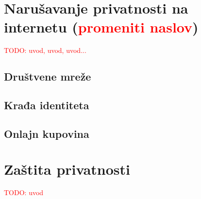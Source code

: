 \documentclass[a4paper]{article}
\newcommand\todos[1]{\textcolor{red}{#1}}
\begin{document}
\section{Narušavanje privatnosti na internetu (\todos{promeniti naslov})}
\label{sec:trecePoglavlje}
\todos{TODO: uvod, uvod, uvod...}
\\
\subsection{Društvene mreže}
\subsection{Krađa identiteta}
\subsection{Onlajn kupovina}


\section{Zaštita privatnosti}
\label{sec:zastita}

\todos{TODO: uvod}
\end{document}
